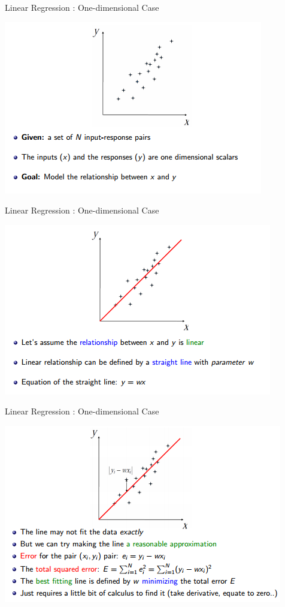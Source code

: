 \documentclass{beamer}
\begin{document}
\begin{frame}{Linear Regression : One-dimensional Case}
    \begin{center}
        \includegraphics[scale=0.6]{linearRegr1D1.png}
    \end{center}
\end{frame}
\begin{frame}{Linear Regression : One-dimensional Case}
    \begin{center}
        \includegraphics[scale=0.6]{linearRegr1D2.png}
    \end{center}
\end{frame}
\begin{frame}{Linear Regression : One-dimensional Case}
    \begin{center}
        \includegraphics[scale=0.6]{linearRegr1D3.png}
    \end{center}
\end{frame}
\end{document}
